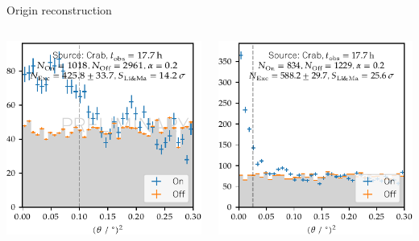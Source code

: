 \begin{frame}[t]{Origin reconstruction}
\begin{columns}[onlytextwidth]
\begin{column}{0.475\textwidth}
    \includegraphics[width=\textwidth]{fig/theta2_plot.pdf}
\end{column}
\hfill%
\begin{column}{0.475\textwidth}
    \includegraphics[width=\textwidth]{fig/theta2.pdf}

\end{column}
\end{columns}
\end{frame}
